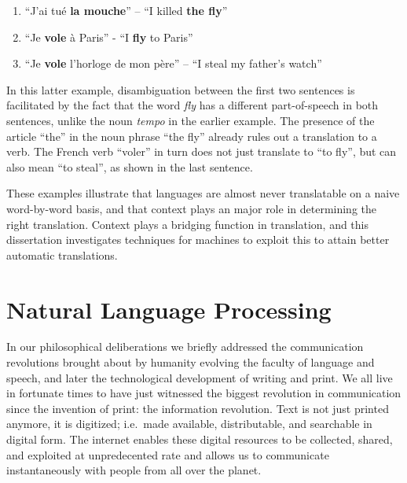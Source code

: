 \begin{enumerate}
\item ``J'ai tué \textbf{la mouche}'' -- ``I killed \textbf{the fly}''
\item ``Je \textbf{vole} à Paris'' - ``I \textbf{fly} to Paris''
\item ``Je \textbf{vole} l'horloge de mon père'' -- ``I steal my father's watch''
\end{enumerate}

In this latter example, disambiguation between the first two sentences is
facilitated by the fact that the word \emph{fly} has a different
part-of-speech in both sentences, unlike the noun \emph{tempo} in the earlier example.
The presence of the article ``the'' in the noun phrase ``the fly'' already
rules out a translation to a verb. The French verb ``voler'' in turn does not
just translate to ``to fly'', but can also mean ``to steal'', as shown in
the last sentence. 

These examples illustrate that languages are almost never translatable on a naive
word-by-word basis, and that context plays an major role in determining the
right translation. Context plays a bridging function in translation, and this
dissertation investigates techniques for machines to exploit this to attain
better automatic translations.

\section{Natural Language Processing}

In our philosophical deliberations we briefly addressed the communication
revolutions brought about by humanity evolving the faculty of language and
speech, and later the technological development of writing and print. We all
live in fortunate times to have just witnessed the biggest revolution in
communication since the invention of print: the information revolution. Text is
not just printed anymore, it is digitized; i.e.\ made available, distributable,
and searchable in digital form. The internet enables these digital resources to
be collected, shared, and exploited at unpredecented rate and allows us to
communicate instantaneously with people from all over the planet. 



